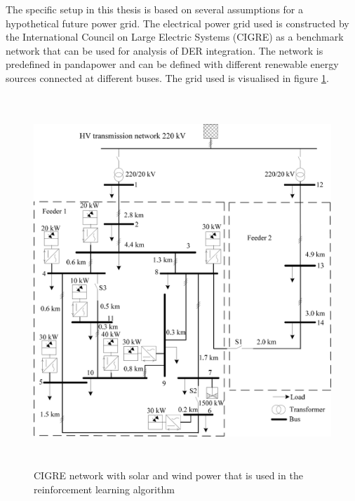 \documentclass[class=book, crop=false]{standalone}
\begin{document}
The specific setup in this thesis is based on several assumptions for a hypothetical future power grid. The electrical power grid used is constructed by the International Council on Large Electric Systems (CIGRE) as a benchmark network that can be used for analysis of DER integration\cite{cigre}. The network is predefined in pandapower and can be defined with different renewable energy sources connected at different buses. The grid used is visualised in figure \ref{fig:problem:cigre_network}. 

\begin{figure}[H]
    \includegraphics[height=14cm, width=13.5cm]{figures/cigre_network_mv_der.png}
    \caption[size = 9]{CIGRE network with solar and wind power that is used in the reinforcement learning algorithm}
    \label{fig:problem:cigre_network}
\end{figure}
\end{document}
